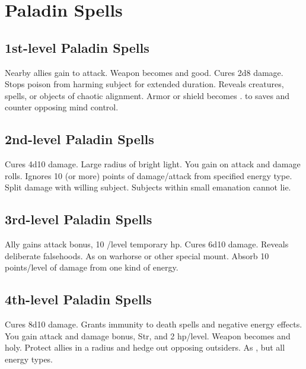 \section{Paladin Spells}  

\subsection{1st-level Paladin Spells}
\begin{spelllist}
 Nearby allies gain  to attack.
 Weapon becomes  and good.
 Cures 2d8 damage.
 Stops poison from harming subject for extended duration.
 Reveals creatures, spells, or objects of chaotic alignment.
 Armor or shield becomes .
  to saves and counter opposing mind control.
\end{spelllist}

\subsection{2nd-level Paladin Spells}
\begin{spelllist}
 Cures 4d10 damage.
 Large radius of bright light.
 You gain  on attack and damage rolls.
 Ignores 10 (or more) points of damage/attack from specified energy type.
 Split damage with willing subject.
 Subjects within small emanation cannot lie.
\end{spelllist}

\subsection{3rd-level Paladin Spells}
\begin{spelllist} 
 Ally gains  attack bonus, 10 /level temporary hp.
 Cures 6d10 damage.
 Reveals deliberate falsehoods.
 As  on warhorse or other special mount.
 Absorb 10 points/level of damage from one kind of energy.
\end{spelllist}

\subsection{4th-level Paladin Spells}
\begin{spelllist}
 Cures 8d10 damage.
 Grants immunity to death spells and negative energy effects.
 You gain attack and damage bonus,  Str, and 2 hp/level.
 Weapon becomes  and holy.
 Protect allies in a \areamed radius and hedge out opposing outsiders.
 As , but all energy types. 
\end{spelllist}


